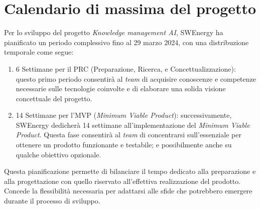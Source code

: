 \section{Calendario di massima del progetto}

Per lo sviluppo del progetto \textit{Knowledge management AI}, SWEnergy ha 
pianificato un periodo complessivo fino al 29 marzo 2024, con una distribuzione 
temporale come segue:
\begin{enumerate}
	\item 6 Settimane per il PRC (Preparazione, Ricerca, e Concettualizzazione): 
	questo primo periodo consentirà al \textit{team} di acquisire conoscenze e 
	competenze necessarie sulle tecnologie coinvolte e di elaborare una solida 
	visione concettuale del progetto.

	\item 14 Settimane per l'MVP (\textit{Minimum Viable Product}): 
	successivamente, SWEnergy dedicherà 14 settimane all'implementazione del
	\textit{Minimum Viable Product}. Questa fase consentirà al \textit{team} di 
	concentrarsi sull'essenziale per ottenere un prodotto funzionante e 
	testabile; e possibilmente anche su qualche obiettivo opzionale.
\end{enumerate}

\noindent
Questa pianificazione permette di bilanciare il tempo dedicato alla 
preparazione e alla progettazione con quello riservato all'effettiva 
realizzazione del prodotto. Concede la flessibilità necessaria per adattarsi 
alle sfide che potrebbero emergere durante il processo di sviluppo.
